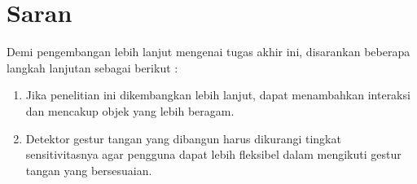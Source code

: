 \section{Saran}
\vspace{1ex}
Demi pengembangan lebih lanjut mengenai tugas akhir ini, disarankan beberapa langkah lanjutan sebagai berikut :
\begin{enumerate} [nolistsep]
	\item Jika penelitian ini dikembangkan lebih lanjut, dapat menambahkan interaksi dan mencakup objek yang lebih beragam.
	\item Detektor gestur tangan yang dibangun harus dikurangi tingkat sensitivitasnya agar pengguna dapat lebih fleksibel dalam mengikuti gestur tangan yang bersesuaian.
\end{enumerate}
\vspace{2ex}